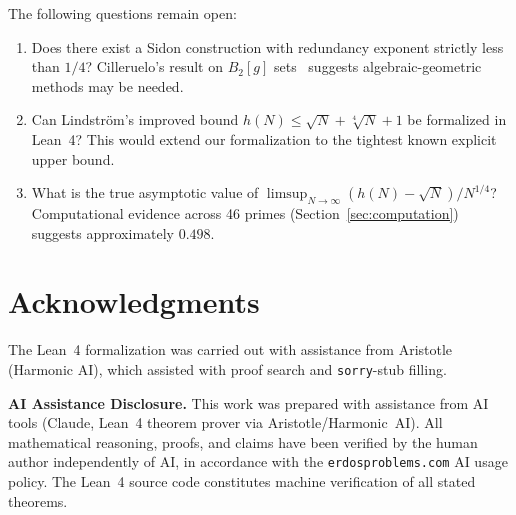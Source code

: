 \documentclass[11pt]{amsart}
\theoremstyle{plain}
\theoremstyle{definition}
\theoremstyle{remark}
\begin{document}
The following questions remain open:
\begin{enumerate}
\item Does there exist a Sidon construction with redundancy exponent
  strictly less than $1/4$?  Cilleruelo's result on $B_2[g]$
  sets~\cite{cilleruelo_2010} suggests algebraic-geometric
  methods may be needed.
\item Can Lindstr\"om's improved bound $h(N) \leq \sqrt{N} +
  \sqrt[4]{N} + 1$ be formalized in Lean~4?  This would extend our
  formalization to the tightest known explicit upper bound.
\item What is the true asymptotic value of
  $\limsup_{N\to\infty}(h(N) - \sqrt{N})/N^{1/4}$?
  Computational evidence across 46 primes
  (Section~\ref{sec:computation}) suggests approximately $0.498$.
\end{enumerate}

\section*{Acknowledgments}

The Lean~4 formalization was carried out with assistance from
Aristotle (Harmonic AI), which assisted with proof search and
\texttt{sorry}-stub filling.

\medskip
\textbf{AI Assistance Disclosure.}
This work was prepared with assistance from AI tools (Claude,
Lean~4 theorem prover via Aristotle/Harmonic~AI).
All mathematical reasoning, proofs, and claims have been verified by
the human author independently of AI, in accordance with the
\texttt{erdosproblems.com} AI usage policy.
The Lean~4 source code constitutes machine verification of all
stated theorems.
\end{document}
